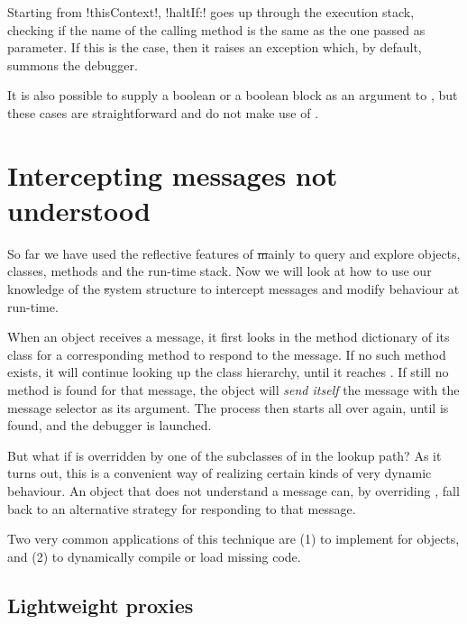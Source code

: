 \documentclass[a4paper,10pt,twoside]{book}
\begin{document}
Starting from \ct!thisContext!, \ct!haltIf:! goes up through the execution stack, checking if the name of the calling method is the same as the one passed as parameter.
If this is the case, then it raises an exception which, by default, summons the debugger.

It is also possible to supply a boolean or a boolean block as an argument to , but these cases are straightforward and do not make use of .

\section{Intercepting messages not understood}

So far we have used the reflective features of \st mainly to query and explore objects, classes, methods and the run-time stack. Now we will look at how to use our knowledge of the \st system structure to intercept messages and modify behaviour at run-time.

When an object receives a message, it first looks in the method dictionary of its class for a corresponding method to respond to the message.
If no such method exists, it will continue looking up the class hierarchy, until it reaches . If still no method is found for that message, the object will \emph{send itself} the message  with the message selector as its argument.
The process then starts all over again, until  is found, and the debugger is launched.

But what if  is overridden by one of the subclasses of  in the lookup path?
As it turns out, this is a convenient way of realizing certain kinds of very dynamic behaviour. An object that does not understand a message can, by overriding , fall back to an alternative strategy for responding to that message.

Two very common applications of this technique are (1) to implement  for objects, and (2) to dynamically compile or load missing code.

\subsection{Lightweight proxies}
\end{document}
